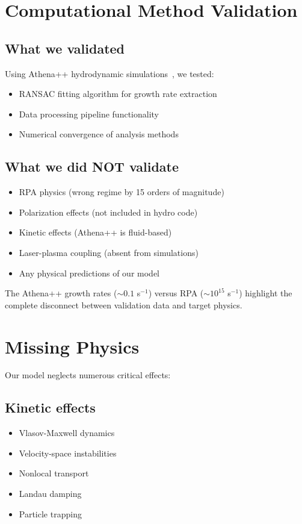 \documentclass[aps,pre,twocolumn,showpacs,superscriptaddress]{revtex4-2}
\theoremstyle{definition}
\begin{document}
\section{Computational Method Validation}\label{sec:computational}

\subsection{What we validated}

Using Athena++ hydrodynamic simulations~\cite{Stone2020ApJS,McClellan2023}, we tested:
\begin{itemize}
\item RANSAC fitting algorithm for growth rate extraction
\item Data processing pipeline functionality
\item Numerical convergence of analysis methods
\end{itemize}

\subsection{What we did NOT validate}

\begin{itemize}
\item RPA physics (wrong regime by 15 orders of magnitude)
\item Polarization effects (not included in hydro code)
\item Kinetic effects (Athena++ is fluid-based)
\item Laser-plasma coupling (absent from simulations)
\item Any physical predictions of our model
\end{itemize}

The Athena++ growth rates ($\sim 0.1$ s$^{-1}$) versus RPA ($\sim 10^{15}$ s$^{-1}$) highlight the complete disconnect between validation data and target physics.

\section{Missing Physics}\label{sec:missing}

Our model neglects numerous critical effects:

\subsection{Kinetic effects}
\begin{itemize}
\item Vlasov-Maxwell dynamics
\item Velocity-space instabilities
\item Nonlocal transport
\item Landau damping
\item Particle trapping
\end{itemize}
\end{document}

